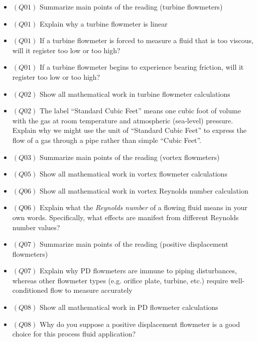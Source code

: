 \begin{itemize}
\item{$(Q01)$} Summarize main points of the reading (turbine flowmeters)
\item{$(Q01)$} Explain why a turbine flowmeter is linear
\item{$(Q01)$} If a turbine flowmeter is forced to measure a fluid that is too viscous, will it register too low or too high?
\item{$(Q01)$} If a turbine flowmeter begins to experience bearing friction, will it register too low or too high?
\item{$(Q02)$} Show all mathematical work in turbine flowmeter calculations
\item{$(Q02)$} The label ``Standard Cubic Feet'' means one cubic foot of volume with the gas at room temperature and atmospheric (sea-level) pressure.  Explain why we might use the unit of ``Standard Cubic Feet'' to express the flow of a gas through a pipe rather than simple ``Cubic Feet''.
\item{$(Q03)$} Summarize main points of the reading (vortex flowmeters)
\item{$(Q05)$} Show all mathematical work in vortex flowmeter calculations
\item{$(Q06)$} Show all mathematical work in vortex Reynolds number calculation
\item{$(Q06)$} Explain what the {\it Reynolds number} of a flowing fluid means in your own words.  Specifically, what effects are manifest from different Reynolds number values?
\item{$(Q07)$} Summarize main points of the reading (positive displacement flowmeters)
\item{$(Q07)$} Explain why PD flowmeters are immune to piping disturbances, whereas other flowmeter types (e.g. orifice plate, turbine, etc.) require well-conditioned flow to measure accurately
\item{$(Q08)$} Show all mathematical work in PD flowmeter calculations
\item{$(Q08)$} Why do you suppose a positive displacement flowmeter is a good choice for this process fluid application?
\medskip


\end{itemize}
